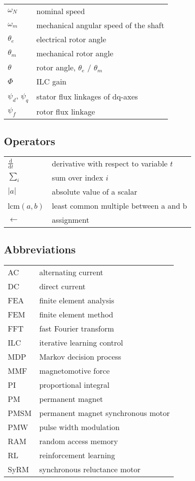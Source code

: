 \documentclass[english, 12pt, a4paper, elec, utf8, a-2b, online]{aaltothesis}
\begin{document}
\begin{tabular}{ll}
$\omega_N$    & nominal speed \\
$\omega_m$    & mechanical angular speed of the shaft \\
$\theta_e$    & electrical rotor angle \\
$\theta_m$    & mechanical rotor angle \\
$\theta$      & rotor angle, $\theta_e$ / $\theta_m$ \\
$\Phi$        & ILC gain \\
$\psi_{d}$, $\psi_{q}$ & stator flux linkages of dq-axes \\
$\psi_f$      & rotor flux linkage \\
\end{tabular}

\subsection*{Operators}

\begin{tabular}{ll}
$\displaystyle\frac{\mbox{d}}{\mbox{d} t}$ & derivative with respect to 
variable $t$\\[3mm]
$\sum_i $                       & sum over index $i$\\
$| a | $                         & absolute value of a scalar\\
lcm$({a,b})$ & least common multiple between a and b \\
$\leftarrow$ & assignment \\
\end{tabular}

\subsection*{Abbreviations}

\begin{tabular}{ll}
AC         & alternating current \\
DC         & direct current \\
FEA        & finite element analysis \\
FEM        & finite element method \\
FFT        & fast Fourier transform \\
ILC        & iterative learning control \\
MDP        & Markov decision process \\
MMF        & magnetomotive force \\
PI         & proportional integral \\
PM         & permanent magnet \\
PMSM       & permanent magnet synchronous motor \\
PMW        & pulse width modulation \\
RAM        & random access memory \\
RL         & reinforcement learning \\
SyRM       & synchronous reluctance motor \\
\end{tabular}
\end{document}
